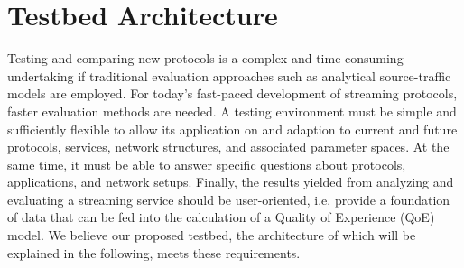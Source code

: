 




\section{Testbed Architecture}
\label{sec:testbed}

Testing and comparing new protocols is a complex and time-consuming undertaking if traditional evaluation approaches such as analytical source-traffic models are employed. For today's fast-paced development of streaming protocols, faster evaluation methods are needed. A testing environment must be simple and sufficiently flexible to allow its application on and adaption to current and future protocols, services, network structures, and associated parameter spaces. 
At the same time, it must be able to answer specific questions about  protocols, applications, and network setups. Finally, the results yielded from analyzing and evaluating a streaming service should be user-oriented, i.e. provide a foundation of data that can be fed into the calculation of a Quality of Experience (QoE) model. We believe our proposed testbed, the architecture of which will be explained in the following, meets these requirements.

